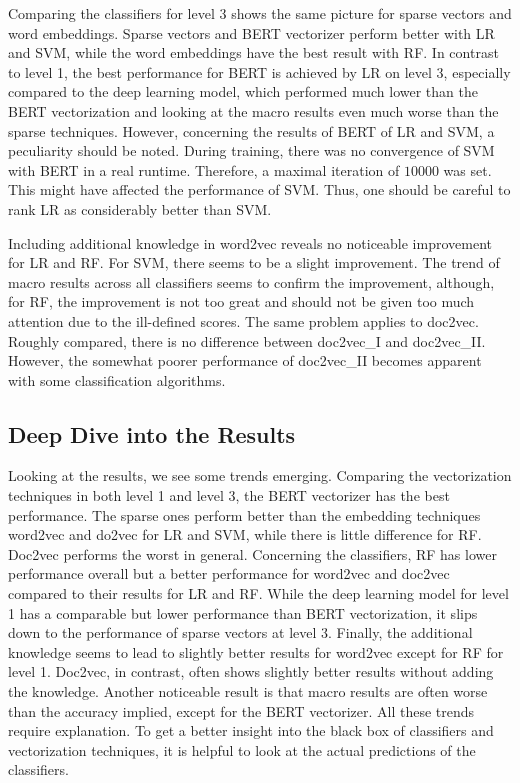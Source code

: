 \documentclass[12pt, a4paper, titlepage]{article}
\begin{document}
Comparing the classifiers for level 3 shows the same picture for sparse vectors and word embeddings. Sparse vectors and \ac{BERT} vectorizer perform better with \ac{LR} and \ac{SVM}, while the word embeddings have the best result with \ac{RF}. In contrast to level 1, the best performance for \ac{BERT} is achieved by \ac{LR} on level 3, especially compared to the deep learning model, which performed much lower than the \ac{BERT} vectorization and looking at the macro results even much worse than the sparse techniques. However, concerning the results of BERT of LR and SVM, a peculiarity should be noted. During training, there was no convergence of \ac{SVM} with \ac{BERT} in a real runtime. Therefore, a maximal iteration of $10000$ was set. This might have affected the performance of \ac{SVM}. Thus, one should be careful to rank \ac{LR} as considerably better than \ac{SVM}. 

Including additional knowledge in word2vec reveals no noticeable improvement for \ac{LR} and \ac{RF}. For \ac{SVM}, there seems to be a slight improvement. The trend of macro results across all classifiers seems to confirm the improvement, although, for RF, the improvement is not too great and should not be given too much attention due to the ill-defined scores. The same problem applies to doc2vec. Roughly compared, there is no difference between doc2vec\_I and doc2vec\_II. However, the somewhat poorer performance of doc2vec\_II becomes apparent with some classification algorithms. 


\subsection{Deep Dive into the Results}
Looking at the results, we see some trends emerging. Comparing the vectorization techniques in both level 1 and level 3, the \ac{BERT} vectorizer has the best performance. The sparse ones perform better than the embedding techniques word2vec and do2vec for LR and SVM, while there is little difference for RF. Doc2vec performs the worst in general. Concerning the classifiers, \ac{RF} has lower performance overall but a better performance for word2vec and doc2vec compared to their results for LR and RF. While the deep learning model for level 1 has a comparable but lower performance than BERT vectorization, it slips down to the performance of sparse vectors at level 3. Finally, the additional knowledge seems to lead to slightly better results for word2vec except for \ac{RF} for level 1. Doc2vec, in contrast, often shows slightly better results without adding the knowledge. Another noticeable result is that macro results are often worse than the accuracy implied, except for the \ac{BERT} vectorizer. All these trends require explanation. To get a better insight into the black box of classifiers and vectorization techniques, it is helpful to look at the actual predictions of the classifiers.
\end{document}
